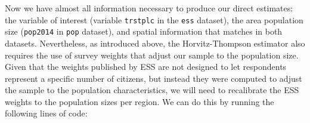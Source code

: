 \documentclass[
]{article}
\newenvironment{Shaded}{\begin{snugshade}}{\end{snugshade}}
\newcommand{\CommentTok}[1]{\textcolor[rgb]{0.56,0.35,0.01}{\textit{#1}}}
\newcommand{\DataTypeTok}[1]{\textcolor[rgb]{0.13,0.29,0.53}{#1}}
\newcommand{\KeywordTok}[1]{\textcolor[rgb]{0.13,0.29,0.53}{\textbf{#1}}}
\newcommand{\NormalTok}[1]{#1}
\newcommand{\OperatorTok}[1]{\textcolor[rgb]{0.81,0.36,0.00}{\textbf{#1}}}
\newcommand{\StringTok}[1]{\textcolor[rgb]{0.31,0.60,0.02}{#1}}
\begin{document}
Now we have almost all information necessary to produce our direct
estimates: the variable of interest (variable \texttt{trstplc} in the
\texttt{ess} dataset), the area population size (\texttt{pop2014} in
\texttt{pop} dataset), and spatial information that matches in both
datasets. Nevertheless, as introduced above, the Horvitz-Thompson
estimator also requires the use of survey weights that adjust our sample
to the population size. Given that the weights published by ESS are not
designed to let respondents represent a specific number of citizens, but
instead they were computed to adjust the sample to the population
characteristics, we will need to recalibrate the ESS weights to the
population sizes per region. We can do this by running the following
lines of code:

\begin{Shaded}
\end{Shaded}
\end{document}
